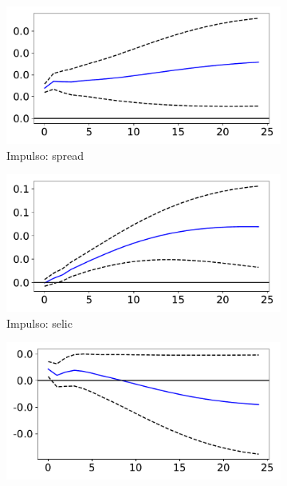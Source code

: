 \documentclass[a4paper,
               article,
               12pt,
               openany,
               oneside,
               english,
               brazil]{abntex2}
\numberwithin{equation}{section}
\begin{document}
    \begin{figure}[!hbt]
        \caption{Função de impulso-resposta ortogonal (spread)}
        \label{irf_orto}
        \begin{subfigure}[t]{.5\linewidth}
            \includegraphics[width = \textwidth, scale=1]{irf/orth_spread_spread.pdf}
            \caption{Impulso: spread}
        \end{subfigure}
        \begin{subfigure}[t]{.5\linewidth}
            \includegraphics[width = \textwidth, scale=1]{irf/orth_spread_selic.pdf}
            \caption{Impulso: selic}
        \end{subfigure}
        \begin{subfigure}[t]{.5\linewidth}
            \includegraphics[width = \textwidth, scale=1]{irf/orth_spread_inad.pdf}

\end{subfigure}
\end{figure}
\end{document}

